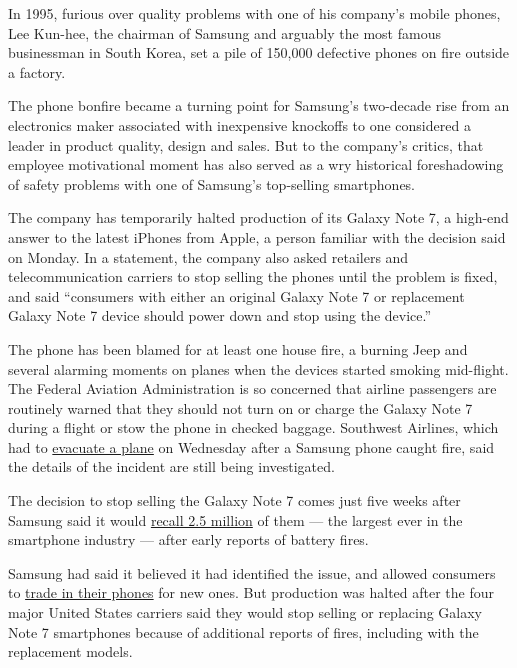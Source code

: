 In 1995, furious over quality problems with one of his company's mobile
phones, Lee Kun-hee, the chairman of Samsung and arguably the most
famous businessman in South Korea, set a pile of 150,000 defective
phones on fire outside a factory.

The phone bonfire became a turning point for Samsung's two-decade rise
from an electronics maker associated with inexpensive knockoffs to one
considered a leader in product quality, design and sales. But to the
company's critics, that employee motivational moment has also served as
a wry historical foreshadowing of safety problems with one of Samsung's
top-selling smartphones.

The company has temporarily halted production of its Galaxy Note 7, a
high-end answer to the latest iPhones from Apple, a person familiar with
the decision said on Monday. In a statement, the company also asked
retailers and telecommunication carriers to stop selling the phones
until the problem is fixed, and said ``consumers with either an original
Galaxy Note 7 or replacement Galaxy Note 7 device should power down and
stop using the device.''

The phone has been blamed for at least one house fire, a burning Jeep
and several alarming moments on planes when the devices started smoking
mid-flight. The Federal Aviation Administration is so concerned that
airline passengers are routinely warned that they should not turn on or
charge the Galaxy Note 7 during a flight or stow the phone in checked
baggage. Southwest Airlines, which had to
\href{http://www.nytimes.com/2016/10/06/business/southwest-samsung.html}{evacuate
a plane} on Wednesday after a Samsung phone caught fire, said the
details of the incident are still being investigated.

The decision to stop selling the Galaxy Note 7 comes just five weeks
after Samsung said it would
\href{http://www.nytimes.com/2016/09/03/business/samsung-galaxy-note-battery.html}{recall
2.5 million} of them --- the largest ever in the smartphone industry ---
after early reports of battery fires.

Samsung had said it believed it had identified the issue, and allowed
consumers to
\href{http://www.nytimes.com/2016/09/20/technology/personaltech/what-to-do-if-you-have-a-samsung-galaxy-note-7.html}{trade
in their phones} for new ones. But production was halted after the four
major United States carriers said they would stop selling or replacing
Galaxy Note 7 smartphones because of additional reports of fires,
including with the replacement models.

